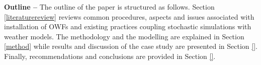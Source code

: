 \textbf{Outline --}
The outline of the paper is structured as follows. Section \ref{literaturereview} reviews common procedures, aspects and issues associated with installation of OWFs and existing practices coupling stochastic simulations with weather models. The methodology and the modelling are explained in Section \ref{method} while results and discussion of the case study are presented in Section \ref{}. Finally, recommendations and conclusions are provided in Section \ref{}.